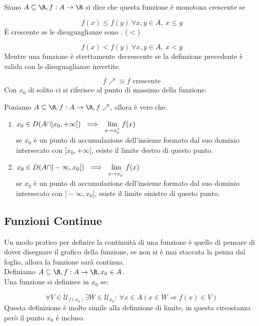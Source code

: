 \documentclass[../analisi.tex]{subfiles}
\begin{document}
\begin{defn}
Siano $\acr, f: A \to \R$ si dice che questa funzione è monotona crescente se

\begin{equation}
	f(x) \leq f(y)\ \forall x,y \in A,\ x \leq y
\end{equation}
È  crescente se le disuguaglianze sono . ($<$)

\begin{equation}
	f(x) < f(y)\ \forall x,y \in A,\ x < y
\end{equation}
Mentre una funzione è strettamente decrescente se la definzione precedente è valida
con le disuguaglianze invertite.
\end{defn}

\begin{equation}
	f \nearrow \equiv f\text{ crescente}
\end{equation}
Con $x_0$ di solito ci si riferisce al punto di massimo della funzione.

\begin{defn}
Poniamo $\acr, f: A \to \R, f \nearrow$, allora è vero che:

\begin{enumerate}
	\item $x_0 \in D(A \cap ] x_0, +\infty[)\ \implies\
		\lim \limits_{\xtx^+} f(x)$\\
		se $x_0$ è un punto di accumulazione dell'insieme formato dal suo
		dominio intersecato con $]x_0,+\infty[$, esiste
		il limite destro di questo punto.
	\item $x_0 \in D(A \cap ] -\infty, x_0[)\ \implies\
		\lim \limits_{\xtx^-} f(x)$\\
		se $x_0$ è un punto di accumulazione dell'insieme formato dal suo
		dominio intersecato con $]-\infty, x_0[$, esiste
		il limite sinistro di questo punto.

\end{enumerate}
\end{defn}

\subsection{Funzioni Continue}%
\label{sub:funzioni_continue}


\begin{defn}[Continuità]
Un modo pratico per definire la continuità di una funzione è quello di pensare di
dover disegnare il grafico della funzione, se non si è mai staccata la penna 
dal foglio, allora la funzione sarà continua.\\
Definiamo $\acr, f: A \to \R, x_0 \in A$.\\
Una funzione si definisce \bt{continua} in $x_0$ se:

\begin{equation}
	\forall V \in \mathcal{U}_{f(x_0)} \exists W \in \mathcal{U}_{x_0}:\
	\forall x \in A ( x \in W \Longrightarrow f(x) \in V)
\end{equation}
Questa definizione è molto simile alla definzione di limite, in questa circostanza
però il punto $x_0$ è incluso.
\end{defn}
\end{document}
